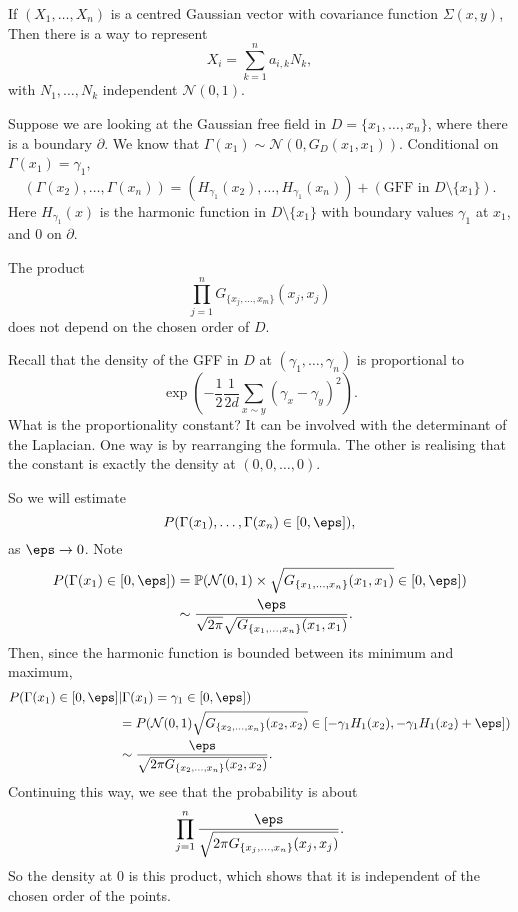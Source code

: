 \documentclass[12pt]{article}
\begin{document}

\begin{remark}
	If $(X_1, \ldots, X_n)$ is a centred Gaussian vector with covariance function $\Sigma(x, y)$, Then there is a way to represent
	\[
	X_i = \sum_{k = 1}^{n} a_{i, k} N_k,
	\]
	with $N_1, \ldots, N_k$ independent $\mathcal{N}(0, 1)$.
\end{remark}

Suppose we are looking at the Gaussian free field in $D = \{x_1, \ldots, x_n\}$, where there is a boundary $\partial$. We know that $\Gamma(x_1) \sim \mathcal{N}(0, G_D(x_1, x_1))$. Conditional on $\Gamma(x_1) = \gamma_1$,
\[
	(\Gamma(x_2), \ldots, \Gamma(x_n)) = (H_{\gamma_1}(x_2), \ldots, H_{\gamma_1}(x_n)) + (\text{GFF in } D \setminus \{x_1\}).
\]
Here $H_{\gamma_1}(x)$ is the harmonic function in $D \setminus \{x_1\}$ with boundary values $\gamma_1$ at $x_1$, and $0$ on $\partial$.

\begin{corollary}
	The product
	\[
		\prod_{j = 1}^{n} G_{\{x_j, \ldots, x_m\}} (x_j, x_j)
	\]
	does not depend on the chosen order of $D$.
\end{corollary}

Recall that the density of the GFF in $D$ at $(\gamma_1, \ldots, \gamma_n)$ is proportional to
\[
	\exp \left( - \frac 12 \frac1{2d} \sum_{x \sim y}(\gamma_x - \gamma_y)^2 \right).
\]
What is the proportionality constant? It can be involved with the determinant of the Laplacian. One way is by rearranging the formula. The other is realising that the constant is exactly the density at $(0, 0, \ldots, 0)$.

So we will estimate
\[
	P(\Gamma(x_1), \ldots, \Gamma(x_n) \in [0, \eps]),
\]
as $\eps \to 0$. Note
\begin{align*}
	P(\Gamma(x_1) \in [0, \eps])&=  \mathbb{P}(\mathcal{N}(0, 1) \times \sqrt{G_{\{x_1, \ldots, x_n\}}(x_1, x_1)} \in [0, \eps]) \\
				    &\sim \frac{\eps}{\sqrt{2 \pi} \sqrt{G_{\{x_1, \ldots, x_n\}}(x_1, x_1)}}.
\end{align*}
Then, since the harmonic function is bounded between its minimum and maximum,
\begin{align*}
	P(\Gamma(x_1) \in [0, \eps] &| \Gamma(x_1) = \gamma_1 \in [0, \eps]) \\
				    &= P(\mathcal{N}(0, 1) \sqrt{G_{\{x_2, \ldots, x_n\}}(x_2, x_2)} \in [- \gamma_1 H_1(x_2), - \gamma_1 H_1(x_2) + \eps]) \\
				    &\sim \frac{\eps}{\sqrt{2 \pi G_{\{x_2, \ldots, x_n\}}(x_2, x_2)}}.
\end{align*}
Continuing this way, we see that the probability is about
\[
	\prod_{j = 1}^{n} \frac{\eps}{\sqrt{2 \pi G_{\{x_j, \ldots, x_n\}}(x_j, x_j)}}.
\]
So the density at $0$ is this product, which shows that it is independent of the chosen order of the points.
\end{document}
